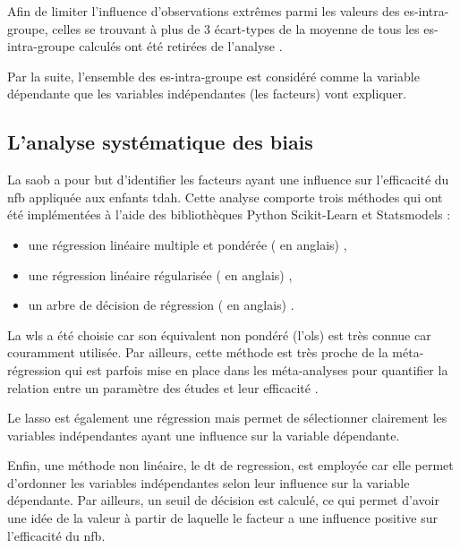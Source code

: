 Afin de limiter l'influence d'observations extrêmes parmi les valeurs des \gls{es}-intra-groupe, celles se trouvant à plus de 3 écart-types de la moyenne
de tous les \gls{es}-intra-groupe calculés ont été retirées de l'analyse \citep{Shewhart1931}.

Par la suite, l'ensemble des \gls{es}-intra-groupe est considéré comme la variable dépendante que les variables indépendantes (les facteurs) vont expliquer. 

\subsection{L'analyse systématique des biais} \label{saob_method}

La \gls{saob} a pour but d'identifier les facteurs ayant une influence sur l'efficacité du \gls{nfb} appliquée aux enfants \gls{tdah}. 
Cette analyse comporte trois méthodes qui ont été implémentées à l'aide des bibliothèques Python Scikit-Learn \citep[version 0.18.1]{Pedregosa2011} et Statsmodels \citep[version 0.8.0]{Seabold2010} : 
\begin{itemize}
    \item une régression linéaire multiple et pondérée ( en anglais) \citep{Montgomery2012},
	  \item une régression linéaire régularisée ( en anglais) \citep{Tibshirani1996},
	  \item un arbre de décision de régression ( en anglais) \citep{Quinlan1986}.
\end{itemize}

La \gls{wls} a été choisie car son équivalent non pondéré (l'\gls{ols}) est très connue car couramment utilisée. Par ailleurs, cette méthode est très proche de la méta-régression qui est 
parfois mise en place dans les méta-analyses pour quantifier la relation entre un paramètre des études et leur efficacité \citep{Cortese2016, Borenstein2009}. 

Le \gls{lasso} est également une régression mais permet de sélectionner clairement les variables indépendantes ayant une influence sur la variable dépendante. 

Enfin, une méthode non linéaire, le \gls{dt} de regression, est employée car elle permet d'ordonner les variables indépendantes selon leur influence sur la variable dépendante. 
Par ailleurs, un seuil de décision est calculé, ce qui permet d'avoir une idée de la valeur à partir de laquelle le facteur a une influence positive sur l'efficacité du \gls{nfb}.

